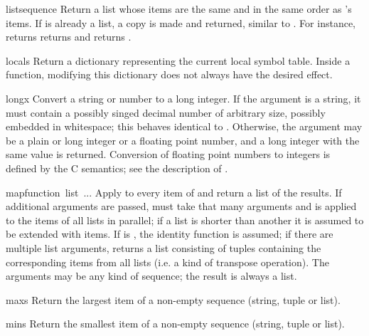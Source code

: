 \begin{funcdesc}{list}{sequence}
Return a list whose items are the same and in the same order as
's items.  If  is already a list,
a copy is made and returned, similar to .  
For instance,  returns
returns \code{['a', 'b', 'c']} and  returns
\code{[1, 2, 3]}.
\end{funcdesc}

\begin{funcdesc}{locals}{}
Return a dictionary representing the current local symbol table.
Inside a function, modifying this dictionary does not always have the
desired effect.
\end{funcdesc}

\begin{funcdesc}{long}{x}
  Convert a string or number to a long integer.  If the argument is a
  string, it must contain a possibly singed decimal number of
  arbitrary size, possibly embedded in whitespace;
  this behaves identical to .
  Otherwise, the argument may be a plain or
  long integer or a floating point number, and a long integer with
  the same value is returned.    Conversion of floating
  point numbers to integers is defined by the C semantics;
  see the description of .
\end{funcdesc}

\begin{funcdesc}{map}{function\, list\, ...}
Apply  to every item of  and return a list
of the results.  If additional  arguments are passed, 
 must take that many arguments and is applied to
the items of all lists in parallel; if a list is shorter than another
it is assumed to be extended with  items.  If
 is , the identity function is assumed; if
there are multiple list arguments,  returns a list
consisting of tuples containing the corresponding items from all lists
(i.e. a kind of transpose operation).  The  arguments may be
any kind of sequence; the result is always a list.
\end{funcdesc}

\begin{funcdesc}{max}{s}
  Return the largest item of a non-empty sequence (string, tuple or
  list).
\end{funcdesc}

\begin{funcdesc}{min}{s}
  Return the smallest item of a non-empty sequence (string, tuple or
  list).
\end{funcdesc}

